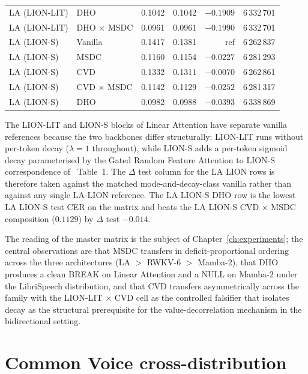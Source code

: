 \begin{table}[p]
\begin{tabularx}{\linewidth}{@{}p{3.0cm} X r r r r@{}}
LA (LION-LIT)      & DHO             & 0.1042 & 0.1042 & $-0.1909$ & 6\,332\,701 \\
LA (LION-LIT)      & DHO $\times$ MSDC & 0.0961 & 0.0961 & $-0.1990$ & 6\,332\,701 \\
\addlinespace
LA (LION-S)        & Vanilla         & 0.1417 & 0.1381 & ref       & 6\,262\,837 \\
LA (LION-S)        & MSDC            & 0.1160 & 0.1154 & $-0.0227$ & 6\,281\,293 \\
LA (LION-S)        & CVD             & 0.1332 & 0.1311 & $-0.0070$ & 6\,262\,861 \\
LA (LION-S)        & CVD $\times$ MSDC & 0.1142 & 0.1129 & $-0.0252$ & 6\,281\,317 \\
LA (LION-S)        & DHO             & 0.0982 & 0.0988 & $-0.0393$ & 6\,338\,869 \\
\bottomrule
\end{tabularx}
\end{table}

The LION-LIT and LION-S blocks of Linear Attention have separate
vanilla references because the two backbones differ structurally:
LION-LIT runs without per-token decay ($\lambda = 1$ throughout),
while LION-S adds a per-token sigmoid decay parameterised by the
Gated Random Feature Attention to LION-S correspondence
of~\citet{afzal2025linear} Table~1. The $\Delta$ test column for
the LA LION rows is therefore taken against the matched
mode-and-decay-class vanilla rather than against any single LA-LION
reference. The LA LION-S DHO row is the lowest LA LION-S test CER
on the matrix and beats the LA LION-S CVD $\times$ MSDC composition
($0.1129$) by $\Delta$ test $-0.014$.

The reading of the master matrix is the subject of
Chapter~\ref{ch:experiments}; the central observations are that
MSDC transfers in deficit-proportional ordering across the three
architectures (LA $>$ RWKV-6 $>$ Mamba-2), that DHO produces a
clean BREAK on Linear Attention and a NULL on Mamba-2 under the
LibriSpeech distribution, and that CVD transfers asymmetrically
across the family with the LION-LIT $\times$ CVD cell as the
controlled falsifier that isolates decay as the structural
prerequisite for the value-decorrelation mechanism in the
bidirectional setting.

\section{Common Voice cross-distribution}\label{app:results:cv}

